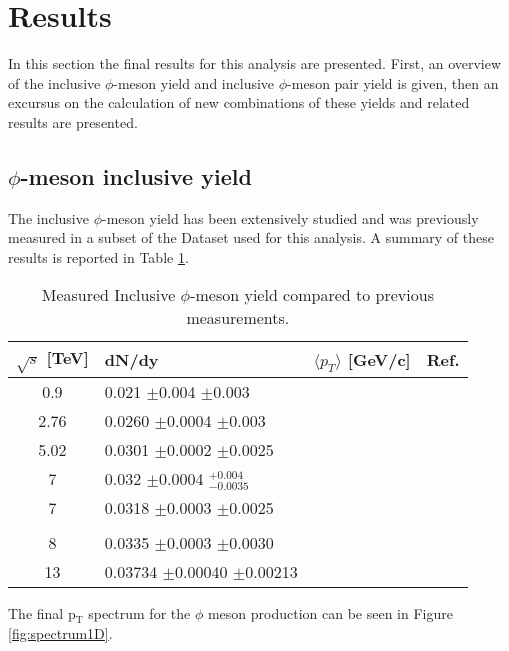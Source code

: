 \section{Results}
\label{sec:Results}
In this section the final results for this analysis are presented. First, an overview of the inclusive $\phi$-meson yield and inclusive $\phi$-meson pair yield is given, then an excursus on the calculation of new combinations of these yields and related results are presented.

\subsection{$\phi$-meson inclusive yield}
The inclusive $\phi$-meson yield has been extensively studied and was previously measured in a subset of the Dataset used for this analysis. A summary of these results is reported in Table \ref{tab:Final_results_1D}.

\begin{table}
	\centering
		\begin{tabular}{c | l | l | c}
		$\sqrt{s}$ [TeV]		&dN/dy										&$\langle p_{T}\rangle$ [GeV/c]				&Ref.\\
			\hline
			\hline
			0.9				&0.021	$\pm$0.004	$\pm$0.003			&										&\cite{phi_0.9}\\
			\hline
			2.76				&0.0260	$\pm$0.0004	$\pm$0.003			&										&\cite{phi_2.76}\\
			\hline
			5.02				&0.0301	$\pm$0.0002	$\pm$0.0025			&										&\cite{phi_5.02}\\
			\hline
			7				&0.032	$\pm$0.0004	$^{+0.004}_{-0.0035}$	&										&\cite{PrevPub}\\
			7				&0.0318	$\pm$0.0003	$\pm$0.0025			&										&\cite{phi_8}\\
			\color{red}{7}		&\color{red}{0.0330 $\pm$0.0003	$\pm$0.0027 $^{+ 0.0024}_{-0.0012}$}	&					&\color{red}{This work}\\
			\hline
			8				&0.0335	$\pm$0.0003	$\pm$0.0030			&										&\cite{phi_8}\\
			\hline
			13				&0.03734	$\pm$0.00040	$\pm$0.00213			&										&\cite{phi_13}\\
			\hline
		\end{tabular}
	\caption{Measured Inclusive $\phi$-meson yield compared to previous measurements.}
	\label{tab:Final_results_1D}
\end{table}

The final p$_{\text{T}}$ spectrum for the $\phi$ meson production can be seen in Figure \ref{fig:spectrum1D}.

